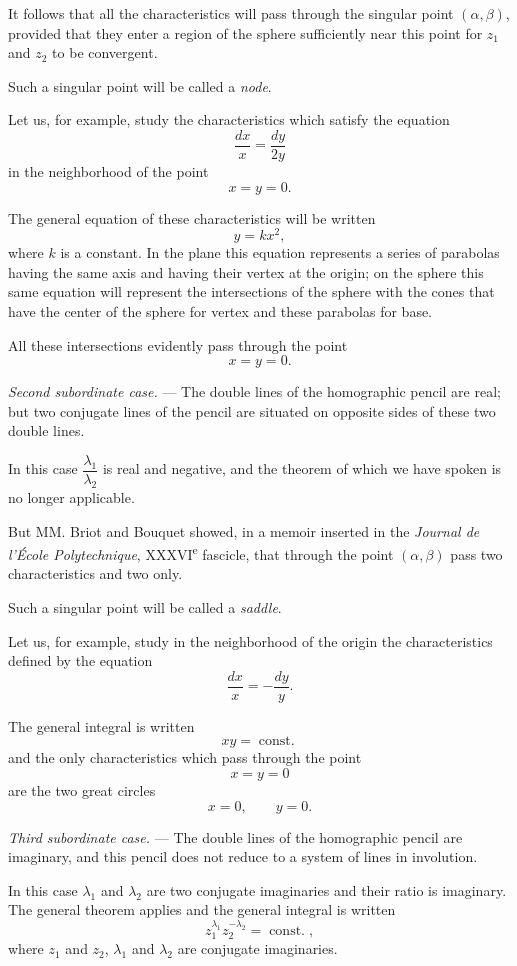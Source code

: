 \documentclass[11pt]{article}
\begin{document}
It follows that all the characteristics will pass through the singular point $(\alpha,\beta)$, provided that they enter a region of the sphere sufficiently near this point for $z_1$ and $z_2$ to be convergent.

Such a singular point will be called a \emph{node}.

Let us, for example, study the characteristics which satisfy the equation
\[
\frac{dx}{x}=\frac{dy}{2y}
\]
in the neighborhood of the point
\[
x=y=0.
\]

The general equation of these characteristics will be written
\[
y=kx^2,
\]
where $k$ is a constant. In the plane this equation represents a series of parabolas having the same axis and having their vertex at the origin; on the sphere this same equation will represent the intersections of the sphere with the cones that have the center of the sphere for vertex and these parabolas for base.

All these intersections evidently pass through the point
\[
x=y=0.
\]

\emph{Second subordinate case.} --- The double lines of the homographic pencil are real; but two conjugate lines of the pencil are situated on opposite sides of these two double lines.

In this case $\dfrac{\lambda_1}{\lambda_2}$ is real and negative, and the theorem of which we have spoken is no longer applicable.

But MM. Briot and Bouquet showed, in a memoir inserted in the \emph{Journal de l’École Polytechnique}, XXXVI\textsuperscript{e} fascicle, that through the point $(\alpha,\beta)$ pass two characteristics and two only.

Such a singular point will be called a \emph{saddle}.

Let us, for example, study in the neighborhood of the origin the characteristics defined by the equation
\[
\frac{dx}{x}=-\frac{dy}{y}.
\]

The general integral is written
\[
xy=\operatorname{const.}
\]
and the only characteristics which pass through the point
\[
x=y=0
\]
are the two great circles
\[
x=0,\qquad y=0.
\]

\emph{Third subordinate case.} --- The double lines of the homographic pencil are imaginary, and this pencil does not reduce to a system of lines in involution.

In this case $\lambda_1$ and $\lambda_2$ are two conjugate imaginaries and their ratio is imaginary. The general theorem applies and the general integral is written
\[
z_1^{\lambda_1}z_2^{-\lambda_2}=\operatorname{const.},
\]
where $z_1$ and $z_2$, $\lambda_1$ and $\lambda_2$ are conjugate imaginaries.
\end{document}
